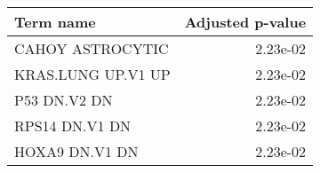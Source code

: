 \begin{tabular}{lr}
\toprule
         Term name &  Adjusted p-value \\
\midrule
  CAHOY ASTROCYTIC &          2.23e-02 \\
KRAS.LUNG UP.V1 UP &          2.23e-02 \\
      P53 DN.V2 DN &          2.23e-02 \\
    RPS14 DN.V1 DN &          2.23e-02 \\
    HOXA9 DN.V1 DN &          2.23e-02 \\
\bottomrule
\end{tabular}
